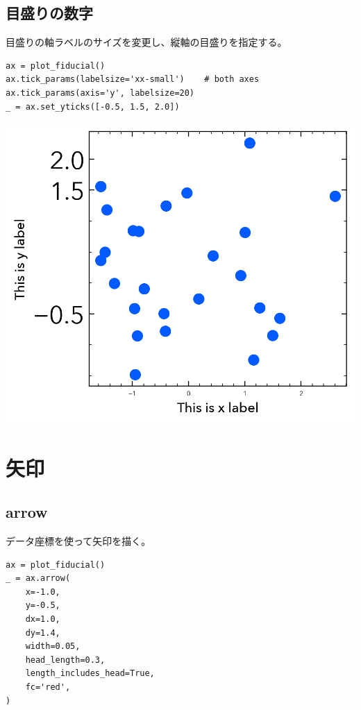 \documentclass[a4paper, 10pt, notitlepage, twocolumn, uplatex, oneside, dvipdfmx]{jsarticle}
\begin{document}
\subsection{目盛りの数字}
\label{sec:org18299a8}
目盛りの軸ラベルのサイズを変更し、縦軸の目盛りを指定する。
\begin{verbatim}
ax = plot_fiducial()
ax.tick_params(labelsize='xx-small')    # both axes
ax.tick_params(axis='y', labelsize=20)
_ = ax.set_yticks([-0.5, 1.5, 2.0])
\end{verbatim}

\begin{center}
\includegraphics[width=1.0\linewidth]{./obipy-resources/params_ticks.png}
\end{center}
\section{矢印}
\label{sec:orga616d91}
\subsection{arrow}
\label{sec:org9bcdd3f}
データ座標を使って矢印を描く。
\begin{verbatim}
ax = plot_fiducial()
_ = ax.arrow(
    x=-1.0,
    y=-0.5,
    dx=1.0,
    dy=1.4,
    width=0.05,
    head_length=0.3,
    length_includes_head=True,
    fc='red',
)
\end{verbatim}
\end{document}
